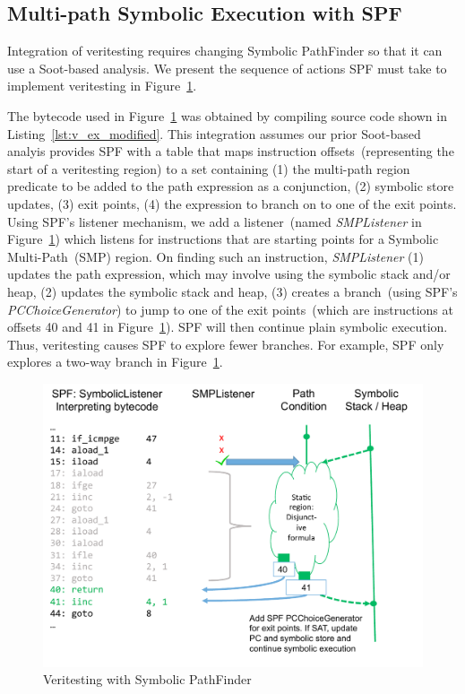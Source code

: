 \subsection{Multi-path Symbolic Execution with SPF}
%
Integration of veritesting requires changing Symbolic PathFinder so that it can 
use a Soot-based analysis.
%
We present the sequence of actions SPF must take to implement veritesting in 
Figure~\ref{fig:spf_veritesting}.
%

%
The bytecode used in Figure~\ref{fig:spf_veritesting} was obtained by compiling 
source code shown in Listing~\ref{lst:v_ex_modified}.
%
This integration assumes our prior Soot-based analyis provides SPF 
with a table that maps instruction offsets~(representing the start of a 
veritesting region) to a set containing (1) the multi-path region predicate to be 
added to the path expression as a conjunction, (2) symbolic store
updates, (3) exit points, (4) the expression to branch on to one of the exit points.
%
Using SPF\rq s listener mechanism, we add a listener~(named
\textit{SMPListener} in Figure~\ref{fig:spf_veritesting}) which listens for instructions that are starting points for a Symbolic Multi-Path~(SMP) region.
%
On finding such an instruction, \textit{SMPListener} 
(1) updates the path expression, which may involve using the symbolic stack and/or heap, 
(2) updates the symbolic stack and heap, 
(3) creates a branch~(using SPF's \textit{PCChoiceGenerator}) to 
jump to one of the exit points~(which are instructions at offsets 40 and
41 in Figure~\ref{fig:spf_veritesting}).
%
SPF will then continue plain symbolic execution.
%
Thus, veritesting causes SPF to explore fewer branches.
%
For example, SPF only explores a two-way branch in Figure~\ref{fig:spf_veritesting}.
%
\begin{figure}[]
\caption{Veritesting with Symbolic PathFinder}
\label{fig:spf_veritesting}
\includegraphics[width=\columnwidth]{figures/spf_veritesting}
\end{figure}
%
